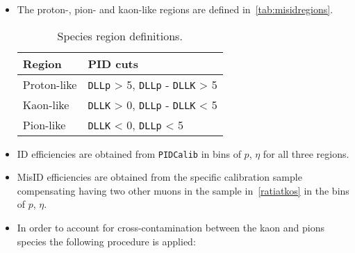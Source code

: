 \begin {itemize}
\item The proton-, pion- and kaon-like regions are defined in~\autoref{tab:misidregions}.

\begin{table}[ht]
\begin{center}
\begin{tabular}[t]{| l | l |}
\hline
Region & PID cuts  \\ \hline
Proton-like & \texttt{DLLp}  > 5, \texttt{DLLp} - \texttt{DLLK} > 5 \\
Kaon-like & \texttt{DLLK} > 0, \texttt{DLLp} - \texttt{DLLK} < 5 \\
Pion-like &  \texttt{DLLK} < 0, \texttt{DLLp} < 5 \\ \hline
\end{tabular}
\end{center}
\caption{Species region definitions.}
\label{tab:misidregions}
\end{table}

\item ID efficiencies are obtained from \texttt{PIDCalib} in bins of $p$, $\eta$ for all three regions.
\item MisID efficiencies are obtained from the specific calibration sample compensating having two other muons in the sample in~\autoref{ratiatkos} in the bins of $p$, $\eta$.
\item In order to account for cross-contamination between the kaon and pions species the following procedure is applied:


\end{itemize}
